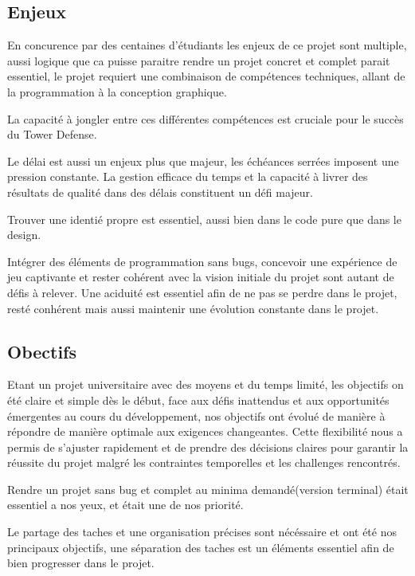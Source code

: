 \documentclass{article}
\begin{document}
\subsection{Enjeux}

En concurence par des centaines d'étudiants les enjeux de ce projet sont multiple, aussi logique que ca puisse paraitre rendre un projet concret et complet parait essentiel, le projet requiert une combinaison de compétences techniques, allant de la programmation à la conception graphique. 

La capacité à jongler entre ces différentes compétences est cruciale pour le succès du Tower Defense. 

Le délai est aussi un enjeux plus que majeur, les échéances serrées imposent une pression constante. La gestion efficace du temps et la capacité à livrer des résultats de qualité dans des délais constituent un défi majeur. 

Trouver une identié propre est essentiel, aussi bien dans le code pure que dans le design.

Intégrer des éléments de programmation sans bugs, concevoir une expérience de jeu captivante et rester cohérent avec la vision initiale du projet sont autant de défis à relever. Une aciduité est essentiel afin de ne pas se perdre dans le projet, resté conhérent mais aussi maintenir une évolution constante dans le projet.

\subsection{Obectifs}

Etant un projet universitaire avec des moyens et du temps limité, les objectifs on été claire et simple dès le début, face aux défis inattendus et aux opportunités émergentes au cours du développement, nos objectifs ont évolué de manière à répondre de manière optimale aux exigences changeantes. Cette flexibilité nous a permis de s'ajuster rapidement et de prendre des décisions claires pour garantir la réussite du projet malgré les contraintes temporelles et les challenges rencontrés.

Rendre un projet sans bug et complet au minima demandé(version terminal) était essentiel a nos yeux, et était une de nos priorité.

Le partage des taches et une organisation précises sont nécéssaire et ont été nos principaux objectifs, une séparation des taches est un éléments essentiel afin de bien progresser dans le projet.
\end{document}
